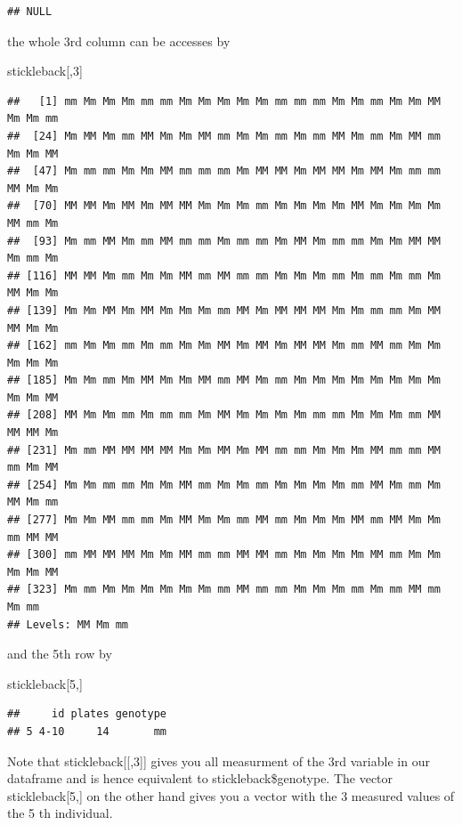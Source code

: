 \documentclass[]{article}
\newenvironment{Shaded}{\begin{snugshade}}{\end{snugshade}}
\newcommand{\DecValTok}[1]{\textcolor[rgb]{0.00,0.00,0.81}{#1}}
\newcommand{\NormalTok}[1]{#1}
\begin{document}
\begin{verbatim}
## NULL
\end{verbatim}

the whole 3rd column can be accesses by

\begin{Shaded}
\begin{Highlighting}[]
\NormalTok{stickleback[,}\DecValTok{3}\NormalTok{]}
\end{Highlighting}
\end{Shaded}

\begin{verbatim}
##   [1] mm Mm Mm Mm mm mm Mm Mm Mm Mm Mm mm mm mm Mm Mm mm Mm Mm MM Mm Mm mm
##  [24] Mm MM Mm mm MM Mm Mm MM mm Mm Mm mm Mm mm MM Mm mm Mm MM mm Mm Mm MM
##  [47] Mm mm mm Mm Mm MM mm mm mm Mm MM MM Mm MM MM Mm MM Mm mm mm MM Mm Mm
##  [70] MM MM Mm MM Mm MM MM Mm Mm Mm mm Mm Mm Mm Mm MM Mm Mm Mm Mm MM mm Mm
##  [93] Mm mm MM Mm mm MM mm mm Mm mm mm Mm MM Mm mm mm Mm Mm MM MM Mm mm Mm
## [116] MM MM Mm mm Mm Mm MM mm MM mm mm Mm Mm Mm mm Mm mm Mm mm Mm MM Mm Mm
## [139] Mm Mm MM Mm MM Mm Mm Mm mm MM Mm MM MM MM Mm Mm mm mm Mm MM MM Mm Mm
## [162] mm Mm Mm mm Mm mm Mm Mm MM Mm MM Mm MM MM Mm mm MM mm Mm Mm Mm Mm Mm
## [185] Mm Mm mm Mm MM Mm Mm MM mm MM Mm mm Mm Mm Mm Mm Mm Mm Mm Mm Mm Mm MM
## [208] MM Mm Mm mm Mm mm mm Mm MM Mm Mm Mm Mm mm mm Mm Mm Mm mm MM MM MM Mm
## [231] Mm mm MM MM MM MM Mm Mm MM Mm MM mm mm Mm Mm Mm MM mm mm MM mm Mm MM
## [254] Mm Mm mm mm Mm Mm MM mm Mm Mm mm Mm Mm Mm Mm mm MM Mm mm Mm MM Mm mm
## [277] Mm Mm MM mm mm Mm MM Mm Mm mm MM mm Mm Mm Mm MM mm MM Mm Mm mm MM MM
## [300] mm MM MM MM Mm Mm MM mm mm MM MM mm Mm Mm Mm Mm MM mm Mm Mm Mm Mm MM
## [323] Mm mm Mm Mm Mm Mm Mm Mm mm MM mm mm Mm Mm Mm mm Mm mm MM mm Mm mm
## Levels: MM Mm mm
\end{verbatim}

and the 5th row by

\begin{Shaded}
\begin{Highlighting}[]
\NormalTok{stickleback[}\DecValTok{5}\NormalTok{,]}
\end{Highlighting}
\end{Shaded}

\begin{verbatim}
##     id plates genotype
## 5 4-10     14       mm
\end{verbatim}

Note that stickleback{[}{[},3{]}{]} gives you all measurment of the 3rd
variable in our dataframe and is hence equivalent to
stickleback\$genotype. The vector stickleback{[}5,{]} on the other hand
gives you a vector with the 3 measured values of the 5 th individual.
\end{document}
